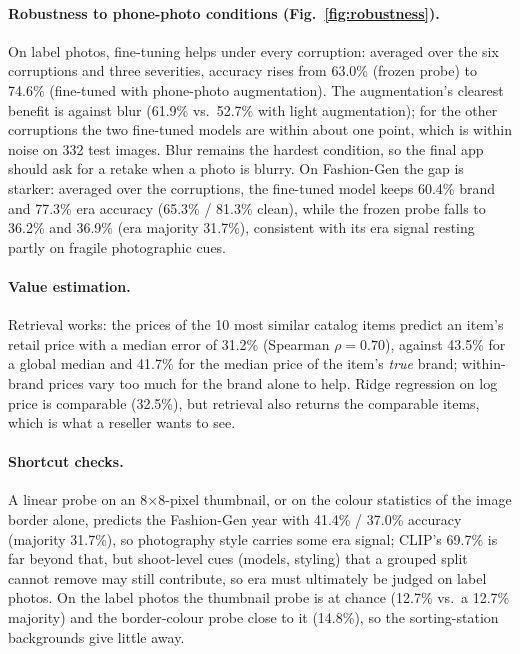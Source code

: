 \paragraph{Robustness to phone-photo conditions (Fig.~\ref{fig:robustness}).}
On label photos, fine-tuning helps under every corruption: averaged over the six corruptions and
three severities, accuracy rises from 63.0\% (frozen probe) to 74.6\% (fine-tuned with phone-photo
augmentation). The augmentation's clearest benefit is against blur (61.9\% vs.\ 52.7\% with light
augmentation); for the other corruptions the two fine-tuned models are within about one point,
which is within noise on 332 test images. Blur remains the hardest condition, so the final app should ask
for a retake when a photo is blurry.
On Fashion-Gen the gap is starker: averaged over the corruptions, the fine-tuned model keeps 60.4\%
brand and 77.3\% era accuracy (65.3\% / 81.3\% clean), while the frozen probe falls to 36.2\% and
36.9\% (era majority 31.7\%), consistent with its era signal resting partly on fragile photographic
cues.



\paragraph{Value estimation.}
Retrieval works: the prices of the 10 most similar catalog items predict an item's retail price
with a median error of 31.2\% (Spearman $\rho=0.70$), against 43.5\% for a global median and 41.7\%
for the median price of the item's \emph{true} brand; within-brand prices vary too much for the
brand alone to help. Ridge regression on log price is comparable (32.5\%), but retrieval also
returns the comparable items, which is what a reseller wants to see.

\paragraph{Shortcut checks.}
A linear probe on an 8$\times$8-pixel thumbnail, or on the colour statistics of the image border
alone, predicts the Fashion-Gen year with 41.4\% / 37.0\% accuracy (majority 31.7\%), so photography
style carries some era signal; CLIP's 69.7\% is far beyond that, but shoot-level cues (models,
styling) that a grouped split cannot remove may still contribute, so era must ultimately be judged
on label photos. On the label photos the thumbnail probe
is at chance (12.7\% vs.\ a 12.7\% majority) and the border-colour probe close to it (14.8\%), so
the sorting-station backgrounds give little away.
